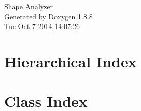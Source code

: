 \documentclass[twoside]{book}
\newcommand{\+}{\discretionary{\mbox{\scriptsize$\hookleftarrow$}}{}{}}
\newcommand{\clearemptydoublepage}{%
  \newpage{\pagestyle{empty}\cleardoublepage}%
}
\begin{document}
\hypersetup{pageanchor=false,
             bookmarks=true,
             bookmarksnumbered=true,
             pdfencoding=unicode
            }
\begin{titlepage}
\vspace*{7cm}
\begin{center}%
{\Large Shape Analyzer }\\
\vspace*{1cm}
{\large Generated by Doxygen 1.8.8}\\
\vspace*{0.5cm}
{\small Tue Oct 7 2014 14:07:26}\\
\end{center}
\end{titlepage}
\clearemptydoublepage
\tableofcontents
\clearemptydoublepage
{}
\hypersetup{pageanchor=true}

\chapter{Hierarchical Index}

\chapter{Class Index}

\end{document}
